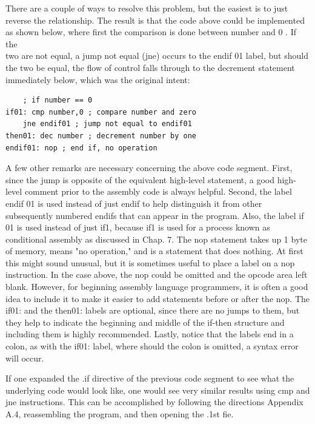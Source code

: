 \documentclass[10pt]{article}
\begin{document}
There are a couple of ways to resolve this problem, but the easiest is to just reverse the relationship. The result is that the code above could be implemented as shown below, where first the comparison is done between number and 0 . If the\\
two are not equal, a jump not equal (jne) occurs to the endif 01 label, but should the two be equal, the flow of control falls through to the decrement statement immediately below, which was the original intent:

\begin{verbatim}
    ; if number == 0
if01: cmp number,0 ; compare number and zero
    jne endif01 ; jump not equal to endif01
then01: dec number ; decrement number by one
endif01: nop ; end if, no operation
\end{verbatim}

A few other remarks are necessary concerning the above code segment. First, since the jump is opposite of the equivalent high-level statement, a good high-level comment prior to the assembly code is always helpful. Second, the label endif 01 is used instead of just endif to help distinguish it from other subsequently numbered endifs that can appear in the program. Also, the label if 01 is used instead of just if1, because if1 is used for a process known as conditional assembly as discussed in Chap. 7. The nop statement takes up 1 byte of memory, means "no operation," and is a statement that does nothing. At first this might sound unusual, but it is sometimes useful to place a label on a nop instruction. In the case above, the nop could be omitted and the opcode area left blank. However, for beginning assembly language programmers, it is often a good idea to include it to make it easier to add statements before or after the nop. The if01: and the then01: labels are optional, since there are no jumps to them, but they help to indicate the beginning and middle of the if-then structure and including them is highly recommended. Lastly, notice that the labels end in a colon, as with the if01: label, where should the colon is omitted, a syntax error will occur.

If one expanded the .if directive of the previous code segment to see what the underlying code would look like, one would see very similar results using cmp and jne instructions. This can be accomplished by following the directions Appendix A.4, reassembling the program, and then opening the .1st fie.
\end{document}
